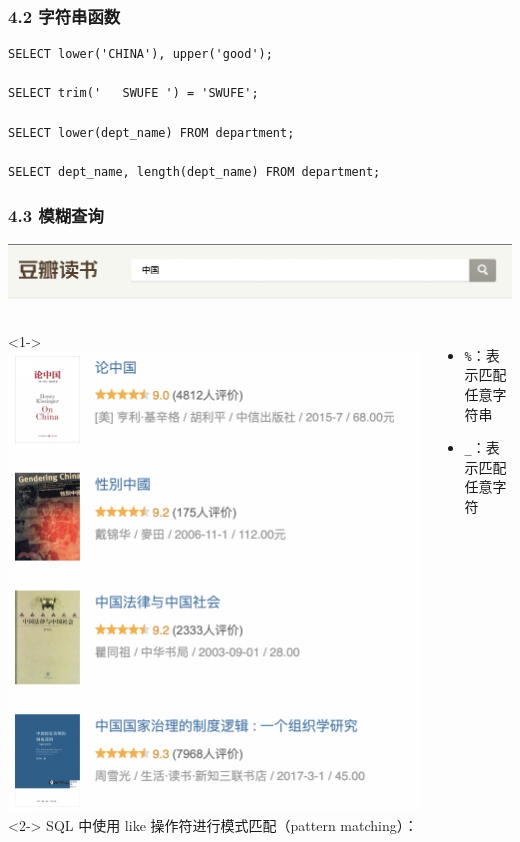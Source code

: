 \documentclass[aspectratio=169, 14pt]{beamer}
\begin{document}
\begin{frame}[fragile]
	\frametitle{4.2 字符串函数}

	\begin{verbatim} 
SELECT lower('CHINA'), upper('good');

SELECT trim('   SWUFE ') = 'SWUFE';

SELECT lower(dept_name) FROM department;

SELECT dept_name, length(dept_name) FROM department;
\end{verbatim}

\end{frame}

\begin{frame}
	\frametitle{4.3 模糊查询}
	\includegraphics[width=.8\textwidth]{week4/china.png}
	\begin{columns}
		<1->
		\includegraphics[height=.7\paperheight]{week4/china2.png}
		<2->
		SQL 中使用 \alert{like} 操作符进行模式匹配（pattern matching）：
		\begin{itemize}
			\item \texttt{\%}：表示匹配任意字符串
			\item \texttt{\_}：表示匹配任意字符
		\end{itemize}

	\end{columns}

\end{frame}
\end{document}
